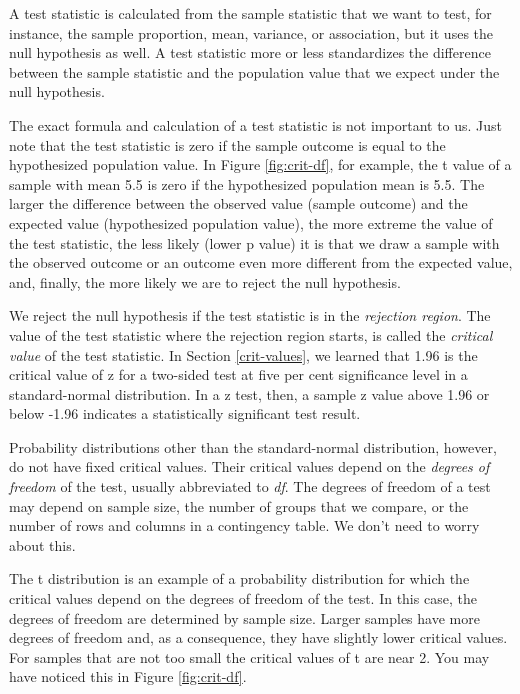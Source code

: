 \documentclass[a4paper]{book}
\theoremstyle{definition}
\theoremstyle{definition}
\theoremstyle{definition}
\theoremstyle{remark}
\begin{document}
A test statistic is calculated from the sample statistic that we want to
test, for instance, the sample proportion, mean, variance, or
association, but it uses the null hypothesis as well. A test statistic
more or less standardizes the difference between the sample statistic
and the population value that we expect under the null hypothesis.

The exact formula and calculation of a test statistic is not important
to us. Just note that the test statistic is zero if the sample outcome
is equal to the hypothesized population value. In Figure
\ref{fig:crit-df}, for example, the t value of a sample with mean 5.5 is
zero if the hypothesized population mean is 5.5. The larger the
difference between the observed value (sample outcome) and the expected
value (hypothesized population value), the more extreme the value of the
test statistic, the less likely (lower p value) it is that we draw a
sample with the observed outcome or an outcome even more different from
the expected value, and, finally, the more likely we are to reject the
null hypothesis.

We reject the null hypothesis if the test statistic is in the
\emph{rejection region}. The value of the test statistic where the
rejection region starts, is called the \emph{critical value} of the test
statistic. In Section \ref{crit-values}, we learned that 1.96 is the
critical value of z for a two-sided test at five per cent significance
level in a standard-normal distribution. In a z test, then, a sample z
value above 1.96 or below -1.96 indicates a statistically significant
test result.

Probability distributions other than the standard-normal distribution,
however, do not have fixed critical values. Their critical values depend
on the \emph{degrees of freedom} of the test, usually abbreviated to
\emph{df}. The degrees of freedom of a test may depend on sample size,
the number of groups that we compare, or the number of rows and columns
in a contingency table. We don't need to worry about this.

The t distribution is an example of a probability distribution for which
the critical values depend on the degrees of freedom of the test. In
this case, the degrees of freedom are determined by sample size. Larger
samples have more degrees of freedom and, as a consequence, they have
slightly lower critical values. For samples that are not too small the
critical values of t are near 2. You may have noticed this in Figure
\ref{fig:crit-df}.
\end{document}

